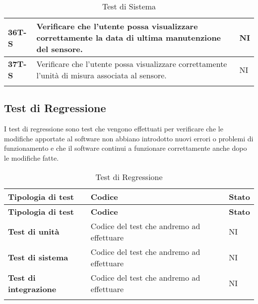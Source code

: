 \begin{longtable}{|>{\raggedright\arraybackslash}m{}|>{\raggedright\arraybackslash}m{}|>{\raggedright\arraybackslash}m{}|}
	\hline
	\textbf{36T-S}  & Verificare che l’utente possa visualizzare correttamente la data di ultima manutenzione del sensore.                                                                               & NI             \\
	\hline
	\textbf{37T-S}  & Verificare che l’utente possa visualizzare correttamente l’unità di misura associata al sensore.                                                                                   & NI             \\
	\hline
	\caption{Test di Sistema} %
	\label{table:14}
\end{longtable}

\subsection{Test di Regressione}
I test di regressione sono test che vengono effettuati per verificare che le modifiche apportate al software non abbiano introdotto nuovi errori o problemi di funzionamento e che il software continui a funzionare correttamente anche dopo le modifiche fatte. \\
\begin{longtable}{|>{\raggedright\arraybackslash}m{}|>{\raggedright\arraybackslash}m{}|>{\raggedright\arraybackslash}m{}|}
	\hline
	\textbf{Tipologia di test}    & \textbf{Codice}                           & \textbf{Stato} \\
	\hline
	\endfirsthead
	\hline
	\textbf{Tipologia di test}    & \textbf{Codice}                           & \textbf{Stato} \\
	\endhead
	\textbf{Test di unità}        & Codice del test che andremo ad effettuare & NI             \\
	\hline
	\textbf{Test di sistema}      & Codice del test che andremo ad effettuare & NI             \\
	\hline
	\textbf{Test di integrazione} & Codice del test che andremo ad effettuare & NI             \\
	\hline
	\caption{Test di Regressione} %
	\label{table:15}
\end{longtable}
\newpage
